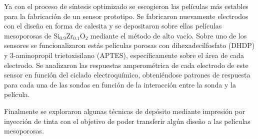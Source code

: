 	Ya con el proceso de síntesis optimizado se escogieron las películas más estables para la fabricación de un sensor prototipo. Se fabricaron nuevamente electrodos con el diseño en forma de calesita y se depositaron sobre ellas películas mesoporosas de Si$_{0.9}$Zr$_{0.1}$O$_2$ mediante el método de alto vacío. Sobre uno de los sensores se funcionalizaron estás películas porosas con dihexadecilfosfato (DHDP) y 3-aminopropil trietoxisilano (APTES), específicamente sobre el área de cada electrodo.
	Se analizaron las respuestas amperométrica de cada electrodo de este sensor en función del ciclado electroquímico, obteniéndose patrones de respuesta para cada una de las sondas en función de la interacción entre la sonda y la película. 
	
	Finalmente se exploraron algunas técnicas de depósito mediante impresión por inyección de tinta con el objetivo de poder transferir algún diseño a las películas mesoporosas.

